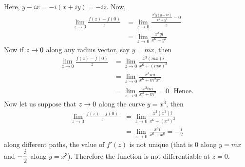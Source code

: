 \begin{solution}
Here, $y-ix = -i(x+iy) = -iz$. Now,
\begin{align*}
        \lim_{z \rightarrow 0}\frac{f(z)-f(0)}{z} &= \lim_{z \rightarrow 0}\frac{\frac{x^3y(y-ix)}{x^6+y^2} - 0}{z}\\
                &= \lim_{z \rightarrow 0} \frac{x^3y i}{x^6+y^2}   
\end{align*}
Now if $z \rightarrow 0$ along any radius vector, say $y=mx$, then
\begin{align*}
        \lim_{z \rightarrow 0}\frac{f(z)-f(0)}{z} &= \lim_{z \rightarrow 0} \frac{x^3 (mx) i}{x^6+(mx)^2}   \\
        &= \lim_{z \rightarrow 0} \frac{x^4 im}{x^6+m^2x^2}   \\
        &= \lim_{z \rightarrow 0} \frac{x^2 im}{x^4+m^2} = 0  ~~~\text{Hence.}  
\end{align*}
Now let us suppose that $z \rightarrow 0$ along the curve $y=x^3$, then
\begin{align*}
        \lim_{z \rightarrow 0}\frac{f(z)-f(0)}{z} &= \lim_{z \rightarrow 0} \frac{x^3 (x^3) i}{x^6+(x^3)^2}   \\
        &= \lim_{z \rightarrow 0} \frac{x^6 i}{x^6+x^6}   = -\frac{i}{2} 
\end{align*}
along different paths, the value of $f'(z)$ is not unique (that is 0 along $y=mx$ and $\displaystyle -\frac{i}{2}$ along $y=x^3$). Therefore the function is not differentiable at $z=0$.
\end{solution}

